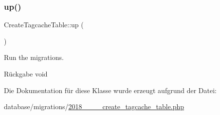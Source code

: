 \subsubsection{\texorpdfstring{up()}{up()}}
{\footnotesize\ttfamily Create\+Tagcache\+Table\+::up (\begin{DoxyParamCaption}{ }\end{DoxyParamCaption})}

Run the migrations.

\begin{DoxyReturn}{Rückgabe}
void 
\end{DoxyReturn}


Die Dokumentation für diese Klasse wurde erzeugt aufgrund der Datei\+:\begin{DoxyCompactItemize}
\item 
database/migrations/\hyperlink{2018__06__15__121944__create__tagcache__table_8php}{2018\+\_\+\_\+\_\+\_\+create\+\_\+tagcache\+\_\+table.\+php}\end{DoxyCompactItemize}
